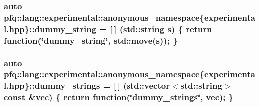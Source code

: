 \subsubsection[{\texorpdfstring{dummy\+\_\+string}{dummy_string}}]{\setlength{\rightskip}{0pt plus 5cm}auto pfq\+::lang\+::experimental\+::anonymous\+\_\+namespace\{experimental.\+hpp\}\+::dummy\+\_\+string = \mbox{[}$\,$\mbox{]} (std\+::string s) \{ return {\bf function}(\char`\"{}dummy\+\_\+string\char`\"{}, std\+::move(s)); \}}\hypertarget{namespacepfq_1_1lang_1_1experimental_1_1anonymous__namespace_02experimental_8hpp_03_a354cb0bfb9d9033e9d87f03fba7c7267}{}\label{namespacepfq_1_1lang_1_1experimental_1_1anonymous__namespace_02experimental_8hpp_03_a354cb0bfb9d9033e9d87f03fba7c7267}
\subsubsection[{\texorpdfstring{dummy\+\_\+strings}{dummy_strings}}]{\setlength{\rightskip}{0pt plus 5cm}auto pfq\+::lang\+::experimental\+::anonymous\+\_\+namespace\{experimental.\+hpp\}\+::dummy\+\_\+strings = \mbox{[}$\,$\mbox{]} (std\+::vector$<$std\+::string$>$ const \&vec) \{ return {\bf function}(\char`\"{}dummy\+\_\+strings\char`\"{}, vec); \}}\hypertarget{namespacepfq_1_1lang_1_1experimental_1_1anonymous__namespace_02experimental_8hpp_03_af6c041f2494f9dd06acb73d42524e3ad}{}\label{namespacepfq_1_1lang_1_1experimental_1_1anonymous__namespace_02experimental_8hpp_03_af6c041f2494f9dd06acb73d42524e3ad}
